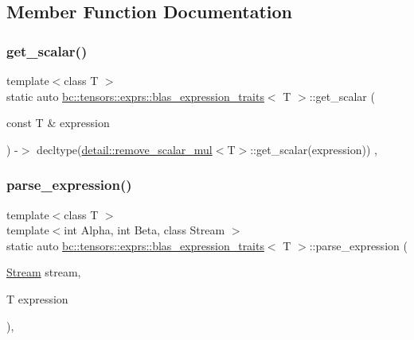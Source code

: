\subsection{Member Function Documentation}
\mbox{\label{structbc_1_1tensors_1_1exprs_1_1blas__expression__traits_a0e9c6280e2c88c35604999b3bc717e99}} 
\subsubsection{\texorpdfstring{get\+\_\+scalar()}{get\_scalar()}}
{\footnotesize\ttfamily template$<$class T $>$ \\
static auto \hyperlink{structbc_1_1tensors_1_1exprs_1_1blas__expression__traits}{bc\+::tensors\+::exprs\+::blas\+\_\+expression\+\_\+traits}$<$ T $>$\+::get\+\_\+scalar (\begin{DoxyParamCaption}\item[{const T \&}]{expression }\end{DoxyParamCaption}) -\/$>$ decltype(\hyperlink{structbc_1_1tensors_1_1exprs_1_1detail_1_1remove__scalar__mul}{detail\+::remove\+\_\+scalar\+\_\+mul}$<$T$>$\+::get\+\_\+scalar(expression)) \hspace{0.3cm}{\ttfamily [inline]}, {\ttfamily [static]}}

\mbox{\label{structbc_1_1tensors_1_1exprs_1_1blas__expression__traits_ad6f0da96452eb001b28b15f5f17b38a3}} 
\subsubsection{\texorpdfstring{parse\+\_\+expression()}{parse\_expression()}}
{\footnotesize\ttfamily template$<$class T $>$ \\
template$<$int Alpha, int Beta, class Stream $>$ \\
static auto \hyperlink{structbc_1_1tensors_1_1exprs_1_1blas__expression__traits}{bc\+::tensors\+::exprs\+::blas\+\_\+expression\+\_\+traits}$<$ T $>$\+::parse\+\_\+expression (\begin{DoxyParamCaption}\item[{\hyperlink{classbc_1_1streams_1_1Stream}{Stream}}]{stream,  }\item[{T}]{expression }\end{DoxyParamCaption})\hspace{0.3cm}{\ttfamily [inline]}, {\ttfamily [static]}}

